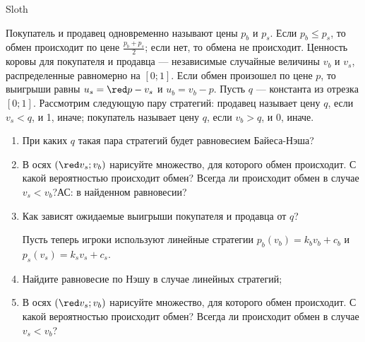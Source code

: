 \begin{problem} \par
\begin{source} Sloth \end{source}
Покупатель и продавец одновременно называют цены  $p_{b} $  и  $p_{s} $. Если  $p_{b} \le p_{s} $, то обмен происходит по цене  $\frac{p_{b} +p_{s} }{2} $; если нет, то обмена не происходит. Ценность коровы для покупателя и продавца --- независимые случайные величины  $v_{b} $  и  $v_{s} $, распределенные равномерно на  $\left[0;1\right]$. Если обмен произошел по цене  $p$, то выигрыши равны  $u_{s} ={\red p-v_{s}}$  и  $u_{b} =v_{b} -p$.
Пусть  $q$  --- константа из отрезка $\left[0;1\right]$. Рассмотрим следующую пару стратегий: продавец называет цену  $q$, если  $v_{s} <q$, и 1, иначе; покупатель называет цену  $q$, если  $v_{b} >q$, и 0, иначе. \par
\begin{enumerate}
\item	При каких  $q$  такая пара стратегий будет равновесием Байеса-Нэша? \par
\item 	В осях  $\left({\red v_{s}} ;v_{b} \right)$  нарисуйте множество, для которого обмен происходит. С какой вероятностью происходит обмен? Всегда ли происходит обмен в случае  $v_{s} <v_{b}$?{\red АС: в найденном равновесии?} \par
\item 	Как зависят ожидаемые выигрыши покупателя и продавца от $q$?\par
Пусть теперь игроки используют линейные стратегии  $p_{b} \left(v_{b} \right)=k_{b} v_{b} +c_{b} $  и  $p_{s} \left(v_{s} \right)=k_{s} v_{s} +c_{s}$.\par
\item 	Найдите равновесие по Нэшу в случае линейных стратегий; \par
\item 	В осях  $\left({\red v_{s}};v_{b} \right)$  нарисуйте множество, для которого обмен происходит. С какой вероятностью происходит обмен? Всегда ли происходит обмен в случае $v_{s} <v_{b}$?
\end{enumerate}


\begin{sol}

\end{sol}
\end{problem}



